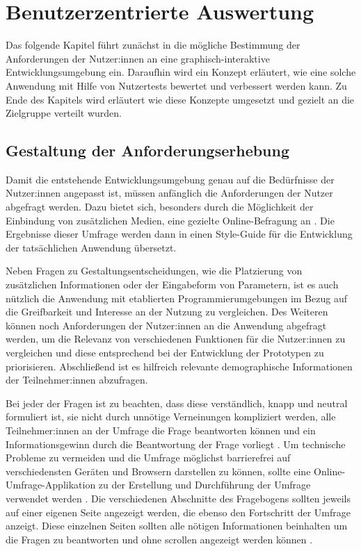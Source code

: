\chapter{Benutzerzentrierte Auswertung} %

Das folgende Kapitel führt zunächst in die mögliche Bestimmung der Anforderungen der Nutzer:innen an eine graphisch-interaktive Entwicklungsumgebung ein. Daraufhin wird ein Konzept erläutert, wie eine solche Anwendung mit Hilfe von Nutzertests bewertet und verbessert werden kann. Zu Ende des Kapitels wird erläutert wie diese Konzepte umgesetzt und gezielt an die Zielgruppe verteilt wurden.

\section{Gestaltung der Anforderungserhebung} %

Damit die entstehende Entwicklungsumgebung genau auf die Bedürfnisse der Nutzer:innen angepasst ist, müssen anfänglich die Anforderungen der Nutzer abgefragt werden. Dazu bietet sich, besonders durch die Möglichkeit der Einbindung von zusätzlichen Medien, eine gezielte Online-Befragung an \cite{Schnell2018MethodenES}. Die Ergebnisse dieser Umfrage werden dann in einen Style-Guide für die Entwicklung der tatsächlichen Anwendung übersetzt.

Neben Fragen zu Gestaltungsentscheidungen, wie die Platzierung von zusätzlichen Informationen oder der Eingabeform von Parametern, ist es auch nützlich die Anwendung mit etablierten Programmierumgebungen im Bezug auf die Greifbarkeit und Interesse an der Nutzung zu vergleichen. Des Weiteren können noch Anforderungen der Nutzer:innen an die Anwendung abgefragt werden, um die Relevanz von verschiedenen Funktionen für die Nutzer:innen zu vergleichen und diese entsprechend bei der Entwicklung der Prototypen zu priorisieren. Abschließend ist es hilfreich relevante demographische Informationen der Teilnehmer:innen abzufragen.

Bei jeder der Fragen ist zu beachten, dass diese verständlich, knapp und neutral formuliert ist, sie nicht durch unnötige Verneinungen kompliziert werden, alle Teilnehmer:innen an der Umfrage die Frage beantworten können und ein Informationsgewinn durch die Beantwortung der Frage vorliegt \cite{Jacobsen2019PraxisbuchUuU}. Um technische Probleme zu vermeiden und die Umfrage möglichst barrierefrei auf verschiedensten Geräten und Browsern darstellen zu können, sollte eine Online-Umfrage-Applikation zu der Erstellung und Durchführung der Umfrage verwendet werden \cite{Schnell2018MethodenES}. Die verschiedenen Abschnitte des Fragebogens sollten jeweils auf einer eigenen Seite angezeigt werden, die ebenso den Fortschritt der Umfrage anzeigt. Diese einzelnen Seiten sollten alle nötigen Informationen beinhalten um die Fragen zu beantworten und ohne scrollen angezeigt werden können \cite{Jacobsen2019PraxisbuchUuU}.

